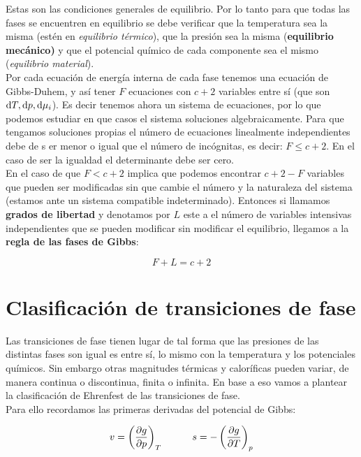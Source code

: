 \documentclass[12pt,a4paper,oneside]{book}
\begin{document}
Estas son las condiciones generales de equilibrio. Por lo tanto para que todas las fases se encuentren en equilibrio se debe verificar que la temperatura sea  la misma (estén en \textit{equilibrio térmico}), que la presión sea la misma (\textbf{equilibrio mecánico)} y que el potencial químico de cada componente sea el mismo (\textit{equilibrio material}). \\

Por cada ecuación de energía interna de cada fase tenemos una ecuación de Gibbs-Duhem, y así tener $F$ ecuaciones con $c+2$ variables entre sí (que son $\mathrm{d} T, \mathrm{d} p, \mathrm{d} \mu_i$). Es decir tenemos ahora un sistema de ecuaciones, por lo que podemos estudiar en que casos el sistema soluciones algebraicamente. Para que tengamos soluciones propias el número de ecuaciones linealmente independientes debe de s er menor o igual que el número de incógnitas, es decir: $F \leq c+2$. En el caso de ser la igualdad el determinante debe ser cero. \\

En el caso de que $F < c+2$ implica que podemos encontrar $c+2-F$ variables que pueden ser modificadas sin que cambie el número y la naturaleza del sistema (estamos ante un sistema compatible indeterminado). Entonces si llamamos \textbf{grados de libertad} y denotamos por $L$ este a el número de variables intensivas independientes que se pueden modificar sin modificar el equilibrio, llegamos a la \textbf{regla de las fases de Gibbs}:

\begin{equation}
F + L = c +2
\end{equation}


\section{Clasificación de transiciones de fase}

Las transiciones de fase tienen lugar de tal forma que las presiones de las distintas fases son igual es entre sí, lo mismo con la temperatura y los potenciales químicos. Sin embargo otras magnitudes térmicas y caloríficas pueden variar, de manera continua o discontinua, finita o infinita. En base a eso vamos a plantear la clasificación de Ehrenfest de las transiciones de fase.  \\

Para ello recordamos las primeras derivadas del potencial de Gibbs:

\begin{equation}
v = \left( \frac{\partial g}{\partial p} \right)_T \quad \quad \quad s = - \left( \frac{\partial g}{\partial T} \right)_p
\end{equation}
\end{document}
